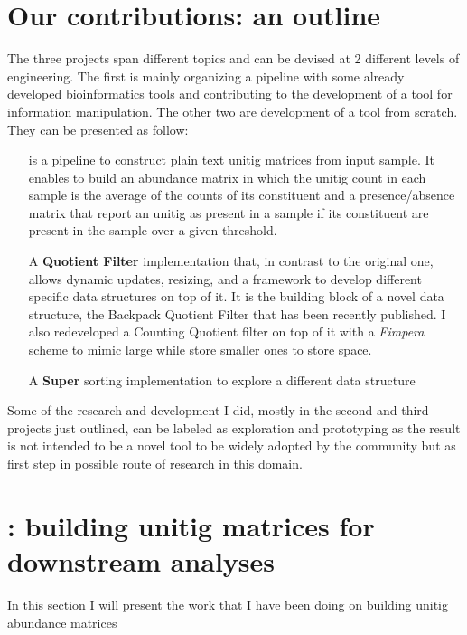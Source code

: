 \section{Our contributions: an outline}
The three projects span different topics and can be devised at 2 different levels of engineering. The first is mainly organizing a pipeline with some already developed bioinformatics tools and contributing to the development of a tool for \kmer information manipulation. The other two are development of a tool from scratch.\\
They can be presented as follow:
\begin{itemize}
	\item[\textbf{\muset}] is a pipeline to construct plain text unitig matrices from input sample. It enables to build an abundance matrix in which the unitig count in each sample is the average of the counts of its constituent \kmers and a presence/absence matrix that report an unitig as present in a sample if its constituent \kmers are present in the sample over a given threshold.\\
	\item[A \textbf{Quotient Filter}] implementation that, in contrast to the original one, allows dynamic updates, resizing, and a framework to develop different specific data structures on top of it. It is the building block of a novel data structure, the Backpack Quotient Filter that has been recently published. I also redeveloped a Counting Quotient filter on top of it with a \emph{Fimpera} scheme to mimic large \kmers while store smaller ones to store space.\\ 
	\item[A \textbf{Super\kmer} sorting] implementation to explore a different data structure 
\end{itemize}
Some of the research and development I did, mostly in the second and third projects just outlined, can be labeled as exploration and prototyping as the result is not intended to be a novel tool to be widely adopted by the community but as first step in possible route of research in this domain.

\section{\muset: building unitig matrices for downstream analyses}
In this section I will present the work that I have been doing on building unitig abundance matrices
